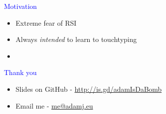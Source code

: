 \documentclass[landscape]{slides}
\begin{document}
\begin{slide}

    \textcolor{blue}{\Large{Motivation}}

    \begin{itemize}
        \item Extreme fear of RSI
        \item Always \emph{intended} to learn to touchtyping
        \item
    \end{itemize}

\end{slide}


\begin{slide}
    \textcolor{blue}{\Large{Thank you}}

    \begin{itemize}
        \item Slides on GitHub - \url{http://is.gd/adamIsDaBomb}
        \item Email me - \url{me@adamj.eu}
    \end{itemize}

\end{slide}
\end{document}
